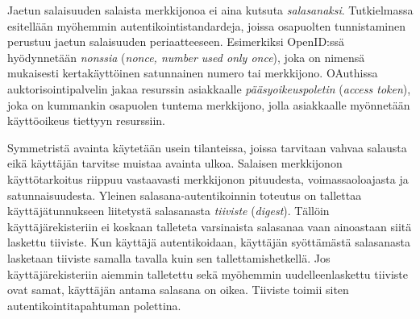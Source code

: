 \documentclass[finnish,gradu]{tktltiki}
\begin{document}
  Jaetun salaisuuden salaista merkkijonoa ei aina kutsuta \emph{salasanaksi}. Tutkielmassa esitellään myöhemmin autentikointistandardeja, joissa osapuolten tunnistaminen perustuu jaetun salaisuuden periaatteeseen. Esimerkiksi OpenID:ssä hyödynnetään \emph{nonssia} (\emph{nonce, number used only once}), joka on nimensä mukaisesti kertakäyttöinen satunnainen numero tai merkkijono. OAuthissa auktorisointipalvelin jakaa resurssin asiakkaalle \emph{pääsyoikeuspoletin} (\emph{access token}), joka on kummankin osapuolen tuntema merkkijono, jolla asiakkaalle myönnetään käyttöoikeus tiettyyn resurssiin.

  Symmetristä avainta käytetään usein tilanteissa, joissa tarvitaan vahvaa salausta eikä käyttäjän tarvitse muistaa avainta ulkoa. Salaisen merkkijonon käyttötarkoitus riippuu vastaavasti merkkijonon pituudesta, voimassaoloajasta ja satunnaisuudesta. Yleinen salasana-autentikoinnin toteutus on tallettaa käyttäjätunnukseen liitetystä salasanasta \emph{tiiviste} (\emph{digest}). Tällöin käyttäjärekisteriin ei koskaan talleteta varsinaista salasanaa vaan ainoastaan siitä laskettu tiiviste. Kun käyttäjä autentikoidaan, käyttäjän syöttämästä salasanasta lasketaan tiiviste samalla tavalla kuin sen tallettamishetkellä. Jos käyttäjärekisteriin aiemmin talletettu sekä myöhemmin uudelleenlaskettu tiiviste ovat samat, käyttäjän antama salasana on oikea. Tiiviste toimii siten autentikointitapahtuman polettina.

\end{document}
